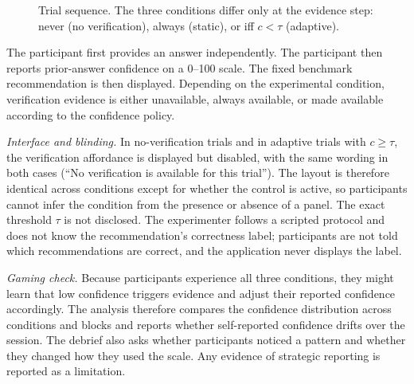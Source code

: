 \documentclass[oneside,final,14pt,a4paper]{extreport}
\begin{document}
\begin{figure}[t]
\centering
{}
\caption{Trial sequence. The three conditions differ only at the evidence
step: never (no verification), always (static), or iff $c<\tau$ (adaptive).}
\label{fig:trial}
\end{figure}

The participant first provides an answer independently. The participant then
reports prior-answer confidence on a 0--100 scale. The fixed benchmark
recommendation is then displayed. Depending on the experimental condition,
verification evidence is either unavailable, always available, or made
available according to the confidence policy.

\emph{Interface and blinding.} In no-verification trials and in adaptive
trials with $c\geq\tau$, the verification affordance is displayed but
disabled, with the same wording in both cases (``No verification is available
for this trial''). The layout is therefore identical across conditions except
for whether the control is active, so participants cannot infer the condition
from the presence or absence of a panel. The exact threshold $\tau$ is not
disclosed. The experimenter follows a scripted protocol and does not know the
recommendation's correctness label; participants are not told which
recommendations are correct, and the application never displays the label.

\emph{Gaming check.} Because participants experience all three conditions,
they might learn that low confidence triggers evidence and adjust their
reported confidence accordingly. The analysis therefore compares the
confidence distribution across conditions and blocks and reports whether
self-reported confidence drifts over the session. The debrief also asks
whether participants noticed a pattern and whether they changed how they used
the scale. Any evidence of strategic reporting is reported as a limitation.
\end{document}
